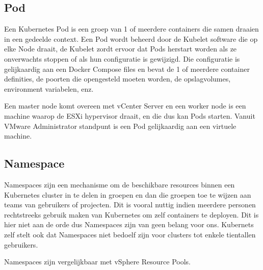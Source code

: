 \subsection{Pod}
Een Kubernetes Pod is een groep van 1 of meerdere containers die samen draaien in een gedeelde context. Een Pod wordt beheerd door de Kubelet software die op elke Node draait, de Kubelet zordt ervoor dat Pods herstart worden als ze onverwachts stoppen of als hun configuratie is gewijzigd. Die configuratie is gelijkaardig aan een Docker Compose files en bevat de 1 of meerdere container definities, de poorten die opengesteld moeten worden, de opslagvolumes, environment variabelen, enz.
\autocite{NirShtein2023}

Een master node komt overeen met vCenter Server en een worker node is een machine waarop de ESXi hypervisor draait, en die dus kan Pods starten. Vanuit VMware Administrator standpunt is een Pod gelijkaardig aan een virtuele machine.\autocite{VMware2019}



\subsection{Namespace}
Namespaces zijn een mechanisme om de beschikbare resources binnen een Kubernetes cluster in te delen in groepen en dan die groepen toe te wijzen aan teams van gebruikers of projecten. Dit is vooral nuttig indien meerdere personen rechtstreeks gebruik maken van Kubernetes om zelf containers te deployen. Dit is hier niet aan de orde dus Namespaces zijn van geen belang voor ons. Kubernets zelf stelt ook dat Namespaces niet bedoelf zijn voor clusters tot enkele tientallen gebruikers.
\autocite{Kubernetes2023c}

Namespaces zijn vergelijkbaar met vSphere Resource Pools.\autocite{VMware2019}
